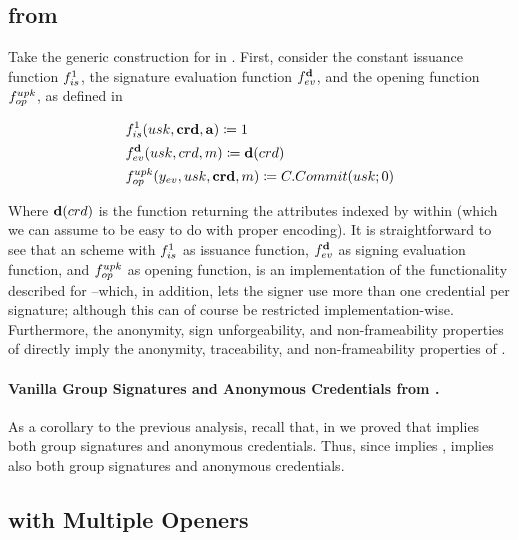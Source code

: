 \subsection{\GSAC from \UAS}
\label{ssec:uas-gsac}

Take the generic construction for \UAS in .
First, consider the constant issuance function $f_{is}^1$, the signature
evaluation function $f_{ev}^{\mathbf{d}}$, and the opening function $f_{op}^{upk}$,
as defined in 

\begin{align}
  & f_{is}^1(usk,\mathbf{crd},\mathbf{a}) \coloneqq 1 \nonumber \\
  & f_{ev}^{\mathbf{d}}(usk,crd,m) \coloneqq \mathbf{d}(crd) \nonumber \\
  & f_{op}^{upk}(y_{ev},usk,\mathbf{crd},m) \coloneqq C.Commit(usk;0)
    \label{eq:uas-gsac-funcs}
\end{align}

Where $\mathbf{d}(crd)$ is the function returning the attributes indexed by
\dattrs within \cred (which we can assume to be easy to do with proper
encoding). It is straightforward to see that an \UAS scheme with $f_{is}^1$
as issuance function, $f_{ev}^{\mathbf{d}}$ as signing evaluation function, and
$f_{op}^{upk}$ as opening function, is an implementation of the functionality
described for \GSAC --which, in addition, lets the signer use more than one
credential per signature; although this can of course be restricted
implementation-wise.
%
Furthermore, the anonymity, sign unforgeability, and non-frameability properties
of \UAS directly imply the anonymity, traceability, and non-frameability
properties of \GSAC.

\paragraph{Vanilla Group Signatures and Anonymous Credentials from \UAS.} As a
corollary to the previous analysis, recall that, in 
we proved that \GSAC implies both group signatures and anonymous credentials.
Thus, since \UAS implies \GSAC, \UAS implies also both group signatures and
anonymous credentials.

\subsection{\UAS with Multiple Openers}
\label{ssec:uas-multiopen}

